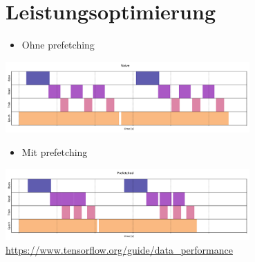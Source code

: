 \documentclass[t]{beamer}
\begin{document}
\section{Leistungsoptimierung}
\begin{frame}
    \begin{itemize}
        \item Ohne prefetching
    \end{itemize}
    \includegraphics[width=0.7\textwidth]{teach-plots/naive-prefetching-crop.pdf}
    \begin{itemize}
        \item Mit prefetching
    \end{itemize}
    \includegraphics[width=0.7\textwidth]{teach-plots/prefetched-crop.pdf}
    \large\href{https://www.tensorflow.org/guide/data_performance}{https://www.tensorflow.org/guide/data\_performance}
\end{frame}
\end{document}
